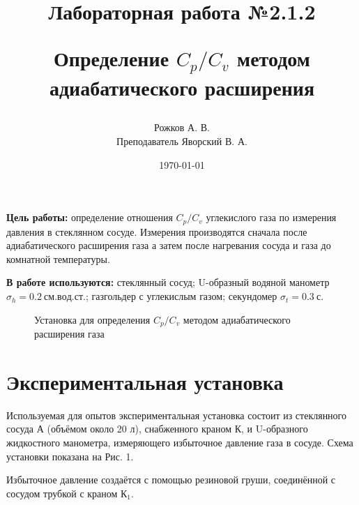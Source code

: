 \documentclass[a4paper, 12pt]{article}
\title{\begin{center}Лабораторная работа №2.1.2\end{center}
Определение $C_p / C_v$ методом адиабатического расширения}
\author{Рожков А. В. \\ Преподаватель Яворский В. А.}
\date{\today}
\begin{document}
    \maketitle
    \newpage

    \textbf{Цель работы:} определение отношения $C_p / C_v$ углекислого газа по измерения давления в стеклянном сосуде. Измерения производятся сначала после адиабатического расширения газа а затем после нагревания сосуда и газа до комнатной температуры.

	\textbf{В работе используются:} стеклянный сосуд; U-образный водяной манометр $\sigma_h = 0.2~см.вод.ст.$; газгольдер с углекислым газом; секундомер $\sigma_t = 0.3~с$.

	\begin{figure}[b!]	\label{plan2}

		\caption{Установка для определения $C_p / C_v$ методом адиабатического расширения газа}

	\end{figure}

	\section{Экспериментальная установка}

		Используемая для опытов экспериментальная установка состоит из стеклянного сосуда А (объёмом около 20 л), снабженного краном К, и U-образного жидкостного манометра, измеряющего избыточное давление газа в сосуде. Схема установки показана на Рис. 1.

		Избыточное давление создаётся с помощью резиновой груши, соединённой с сосудом трубкой с краном $К_1$.
\end{document}
